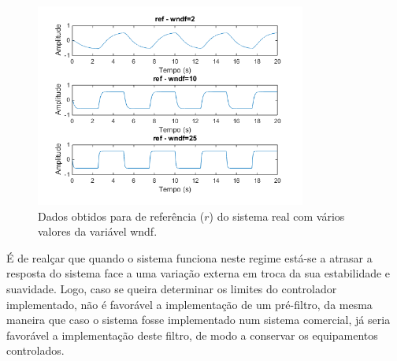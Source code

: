 \documentclass[%
  reprint,
  nofootinbib,
  amsmath,amssymb,
  aps,
  10pt,
  a4paper
]{revtex4-1}
\begin{document}
\begin{figure}[H]
\includegraphics[width=3.5in]{../img/ref_filtro.png}
\caption{Dados obtidos para de referência ($r$) do sistema real com vários valores da variável wndf.}
\label{fig:pf_ref}
\end{figure}
É de realçar que quando o sistema funciona neste regime está-se a atrasar a resposta do sistema face a uma variação externa em troca da sua estabilidade e suavidade. Logo, caso se queira determinar os limites do controlador implementado, não é favorável a implementação de um pré-filtro, da mesma maneira que caso o sistema fosse implementado num sistema comercial, já seria favorável a implementação deste filtro, de modo a conservar os equipamentos controlados.
\end{document}
